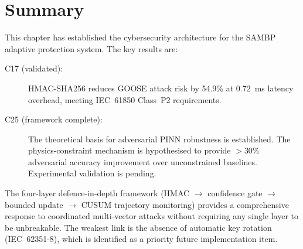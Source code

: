 \section{Summary}
\label{sec:ch12_summary}

This chapter has established the cybersecurity architecture for the SAMBP
adaptive protection system. The key results are:

\begin{description}
\item[C17 (validated):] HMAC-SHA256 reduces GOOSE attack risk by 54.9\%
      at 0.72~ms latency overhead, meeting IEC~61850 Class~P2 requirements.
\item[C25 (framework complete):] The theoretical basis for adversarial
      PINN robustness is established. The physics-constraint mechanism
      is hypothesised to provide $> 30\%$ adversarial accuracy improvement
      over unconstrained baselines. Experimental validation is pending.
\end{description}

The four-layer defence-in-depth framework (HMAC $\to$ confidence gate
$\to$ bounded update $\to$ CUSUM trajectory monitoring) provides a
comprehensive response to coordinated multi-vector attacks without
requiring any single layer to be unbreakable. The weakest link is the
absence of automatic key rotation (IEC~62351-8), which is identified as
a priority future implementation item.
